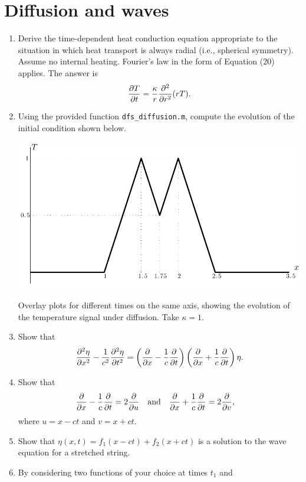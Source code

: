 \documentclass[12pt,twoside,a4paper]{article}
\begin{document}
\section{Diffusion and waves}
\begin{enumerate}
\item Derive the time-dependent heat conduction equation appropriate
  to the situation in which heat transport is always radial (i.e.,
  spherical symmetry). Assume no internal heating.  Fourier's law in
  the form of Equation (20) applies.  The answer
  is $$\frac{\partial T}{\partial t}=\frac{\kappa}{r}\frac{\partial^2 {}}{\partial {r}^2}(rT).$$
\item Using the provided \Mlab function \texttt{dfs\_diffusion.m},
  compute the evolution of the initial condition shown below.
  \begin{center}
    \includegraphics[width=5in]{../figs/Labs/DiffusionIC}
  \end{center}
  Overlay plots for different times on the same axis, showing the
  evolution of the temperature signal under diffusion.  Take
  $\kappa=1$.
\item Show that
  \begin{displaymath}
    \frac{\partial^2 {\eta}}{\partial {x}^2} - \frac{1}{c^2}\frac{\partial^2 {\eta}}{\partial {t}^2}
    = \left(\frac{\partial }{\partial x} - \frac{1}{c}\frac{\partial }{\partial t}\right)\left(\frac{\partial }{\partial x} + \frac{1}{c}\frac{\partial }{\partial t}\right)\eta.
  \end{displaymath}
\item Show that
  \begin{align}
    \frac{\partial }{\partial x} - \frac{1}{c}\frac{\partial }{\partial t} &= 2\frac{\partial }{\partial u} &\text{and}& 
    &\frac{\partial }{\partial x} + \frac{1}{c}\frac{\partial }{\partial t} &= 2\frac{\partial }{\partial v}, \nonumber   
  \end{align}
  where $u=x-ct$ and $v=x+ct$.
\item Show that $\eta(x,t) = f_1(x-ct) + f_2(x+ct)$ is a solution to
  the wave equation for a stretched string.
\item By considering two functions of your choice at times $t_1$ and

\end{enumerate}
\end{document}
